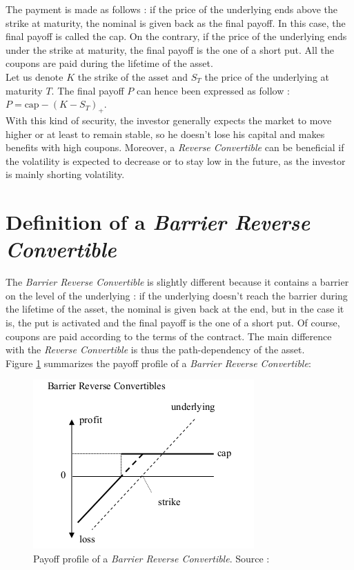 \documentclass[a4paper,11pt,english]{book}
\begin{document}
The payment is made as follows : if the price of the underlying ends above the strike at maturity, the nominal is given back as the final payoff. In this case, the final payoff is called the cap. On the contrary, if the price of the underlying ends under the strike at maturity, the final payoff is the one of a short put. All the coupons are paid during the lifetime of the asset.\\

Let us denote $K$ the strike of the asset and $S_{T}$ the price of the underlying at maturity $T$. The final payoff $P$ can hence been expressed as follow :
$P=\text{cap}-(K-S_{T})_{+}$.\\

With this kind of security, the investor generally expects the market to move higher or at least to remain stable, so he doesn't lose his capital and makes benefits with high coupons. Moreover, a \textit{Reverse Convertible} can be beneficial if the volatility is expected to decrease or to stay low in the future, as the investor is mainly shorting volatility.

\section{Definition of a \textit{Barrier Reverse Convertible}}
\label{sec:BRC-definition}

The \textit{Barrier Reverse Convertible} is slightly different because it contains a barrier on the level of the underlying : if the underlying doesn't reach the barrier during the lifetime of the asset, the nominal is given back at the end, but in the case it is, the put is activated and the final payoff is the one of a short put. Of course, coupons are paid according to the terms of the contract. The main difference with the \textit{Reverse Convertible} is thus the path-dependency of the asset. \\

Figure \ref{fig:BRC-payoff} summarizes the payoff profile of a \textit{Barrier Reverse Convertible}:

\begin{figure}[!h]
    \centering
    \includegraphics[scale=0.65]{images/BRC.png}
    \caption{Payoff profile of a \textit{Barrier Reverse Convertible}. Source : \cite{lindauer2008pricing}}
    \label{fig:BRC-payoff}
\end{figure}
\end{document}
